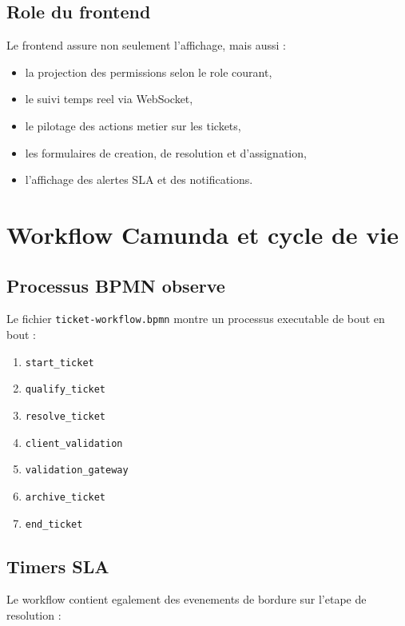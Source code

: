 \documentclass[12pt,a4paper]{article}
\begin{document}
\subsection{Role du frontend}

Le frontend assure non seulement l'affichage, mais aussi :

\begin{itemize}[leftmargin=1.2cm]
  \item la projection des permissions selon le role courant,
  \item le suivi temps reel via WebSocket,
  \item le pilotage des actions metier sur les tickets,
  \item les formulaires de creation, de resolution et d'assignation,
  \item l'affichage des alertes SLA et des notifications.
\end{itemize}

\section{Workflow Camunda et cycle de vie}

\subsection{Processus BPMN observe}

Le fichier \texttt{ticket-workflow.bpmn} montre un processus executable de bout en bout :

\begin{enumerate}[leftmargin=1.2cm]
  \item \texttt{start\_ticket}
  \item \texttt{qualify\_ticket}
  \item \texttt{resolve\_ticket}
  \item \texttt{client\_validation}
  \item \texttt{validation\_gateway}
  \item \texttt{archive\_ticket}
  \item \texttt{end\_ticket}
\end{enumerate}

\subsection{Timers SLA}

Le workflow contient egalement des evenements de bordure sur l'etape de resolution :
\end{document}
